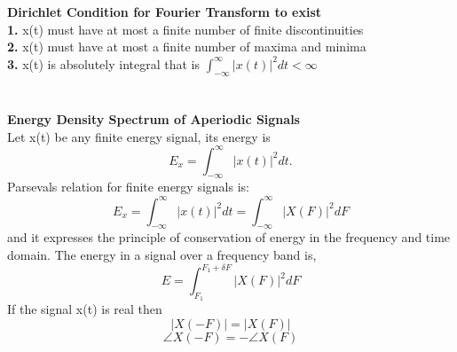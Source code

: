 \documentclass{article} %
\begin{document}
	\\
	\\
	\textbf{Dirichlet Condition for Fourier Transform to exist}\\
	\textbf{1.} x(t) must have at most a finite number of finite discontinuities\\
	\textbf{2.} x(t) must have at most a finite number of maxima and minima\\
	\textbf{3.} x(t) is absolutely integral that is $\int_{-\infty}^{\infty}|x(t)|^2dt < \infty$\\
	\\
	\\
	\textbf{Energy Density Spectrum of Aperiodic Signals}\\
	Let x(t) be any finite energy signal, its energy is
	\begin{equation}
	E_x = \int_{-\infty}^{\infty}|x(t)|^2dt.
	\end{equation}
	Parsevals relation for finite energy signals is:
	\begin{equation}
	E_x = \int_{-\infty}^{\infty}|x(t)|^2dt = \int_{-\infty}^{\infty}|X(F)|^2dF
	\end{equation}
	and it expresses the principle of conservation of energy in the frequency and time domain. The energy in a signal over a frequency 
	band is,
	\begin{equation}
	E = \int_{F_1}^{F_1+\delta F}|X(F)|^2dF
	\end{equation}
	If the signal x(t) is real then 
	\begin{equation}
	|X(-F)| = |X(F)|
	\end{equation}
	\begin{equation}
	\angle X(-F) = -\angle X(F)
	\end{equation}
\end{document}
